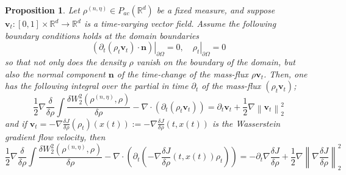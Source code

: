 \documentclass[reqno,11pt,letterpaper]{amsart}
\theoremstyle{plain}
\newtheorem{prop}{Proposition}
\theoremstyle{definition}
\theoremstyle{remark}
\newcommand{\wagrad}{\nabla \frac{\delta J}{\delta \rho}}
\begin{document}
\begin{prop}
    Let $\rho^{(n,\eta)} \in {P}_{ac}(\mathbb{R}^{d})$ be a fixed measure, and suppose $\mathbf{v}_{t}: [0,1] \times \mathbb{R}^{d}  \to \mathbb{R}^{d}$ is a time-varying vector field. Assume the following boundary conditions holds at the domain boundaries
    \[ \left. \left( \partial_{t} ( \rho_{t} \mathbf{v}_{t} ) \cdot \bm{n}\right) \right|_{\partial \Omega}  = 0, \quad \left. \rho_{t} \right|_{\partial \Omega} = 0\]
so that not only does the density $\rho$ vanish on the boundary of the domain, but also the normal component $\bm{n}$ of the time-change of the mass-flux $\rho \mathbf{v}_{t}$. Then, one has the following integral over the partial in time $\partial_{t}$ of the mass-flux $(\rho_{t} \mathbf{v}_{t}  
    )$;
    \[
    \frac{1}{2}\nabla\frac{\delta}{\delta\rho} \int \frac{\delta W_{2}^{2}(\rho^{(n,\eta)}, \rho) }{\delta \rho} - \nabla\cdot\left( \partial_{t} (\rho_{t} \mathbf{v}_{t}  
    ) \right) = \partial_{t} \mathbf{v}_{t} +\frac{1}{2}\nabla \left\lVert \mathbf{v}_{t} \right\rVert_{2}^{2}
    \]
    and if $\mathbf{v}_{t} = - \wagrad (\rho_{t})(x(t)) := - \wagrad (t, x(t))$ is the Wasserstein gradient flow velocity, then
    \[
    \frac{1}{2}\nabla\frac{\delta}{\delta\rho} \int \frac{\delta W_{2}^{2}(\rho^{(n,\eta)}, \rho) }{\delta \rho} - \nabla\cdot\left( \partial_{t}  \left( - \wagrad (t, x(t)) \rho_{t}\right) \right) = - \partial_{t} \wagrad + \frac{1}{2}\nabla \left\lVert \wagrad \right\rVert_{2}^{2}
    \]
\end{prop}\label{prop:accn_HJ}
\end{document}
